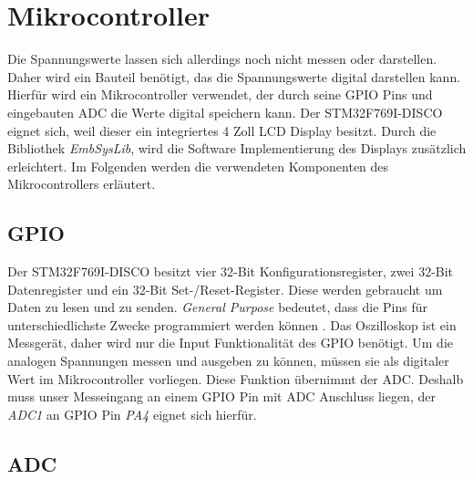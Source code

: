 \section{Mikrocontroller}

Die Spannungswerte lassen sich allerdings noch nicht messen oder darstellen.
Daher wird ein Bauteil benötigt, das die Spannungswerte digital darstellen kann.
Hierfür wird ein Mikrocontroller verwendet, der durch seine GPIO Pins und eingebauten ADC die Werte digital speichern kann.
Der STM32F769I-DISCO eignet sich, weil dieser ein integriertes 4 Zoll LCD Display besitzt\cite{MikroControllerDatasheet_1}.
Durch die Bibliothek \textit{EmbSysLib}, wird die Software Implementierung des Displays zusätzlich
erleichtert\cite{EmbSysLib}.
Im Folgenden werden die verwendeten Komponenten des Mikrocontrollers erläutert.

\subsection{GPIO}
Der STM32F769I-DISCO besitzt vier 32-Bit Konfigurationsregister, zwei 32-Bit Datenregister und ein 32-Bit Set-/Reset-Register.
Diese werden gebraucht um Daten zu lesen und zu senden.
\textit{General Purpose} bedeutet, dass die Pins für unterschiedlichste Zwecke programmiert werden können \cite{RPI-GPIO}. \newline
Das Oszilloskop ist ein Messgerät, daher wird nur die Input Funktionalität des GPIO benötigt.
Um die analogen Spannungen messen und ausgeben zu können, müssen sie als digitaler Wert
im Mikrocontroller vorliegen. \newline Diese Funktion übernimmt der ADC\cite{MikroControllerDatasheet_1}.
Deshalb muss unser Messeingang an einem GPIO Pin mit ADC Anschluss liegen, der \textit{ADC1} an GPIO Pin
\textit{PA4} eignet sich hierfür\cite{STM32F769_PinLayout, MikroControllerDatasheet_Pins}.

\subsection{ADC}

